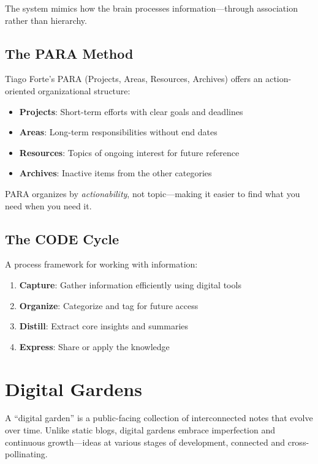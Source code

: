 The system mimics how the brain processes information---through association rather than hierarchy.

\subsection{The PARA Method}

Tiago Forte's PARA \cite{forte2022building} (Projects, Areas, Resources, Archives) offers an action-oriented organizational structure:

\begin{itemize}
    \item \textbf{Projects}: Short-term efforts with clear goals and deadlines
    \item \textbf{Areas}: Long-term responsibilities without end dates
    \item \textbf{Resources}: Topics of ongoing interest for future reference
    \item \textbf{Archives}: Inactive items from the other categories
\end{itemize}

PARA organizes by \emph{actionability}, not topic---making it easier to find what you need when you need it.

\subsection{The CODE Cycle}

A process framework for working with information:

\begin{enumerate}
    \item \textbf{Capture}: Gather information efficiently using digital tools
    \item \textbf{Organize}: Categorize and tag for future access
    \item \textbf{Distill}: Extract core insights and summaries
    \item \textbf{Express}: Share or apply the knowledge
\end{enumerate}

\section{Digital Gardens}

A ``digital garden'' is a public-facing collection of interconnected notes that evolve over time. Unlike static blogs, digital gardens embrace imperfection and continuous growth---ideas at various stages of development, connected and cross-pollinating.

